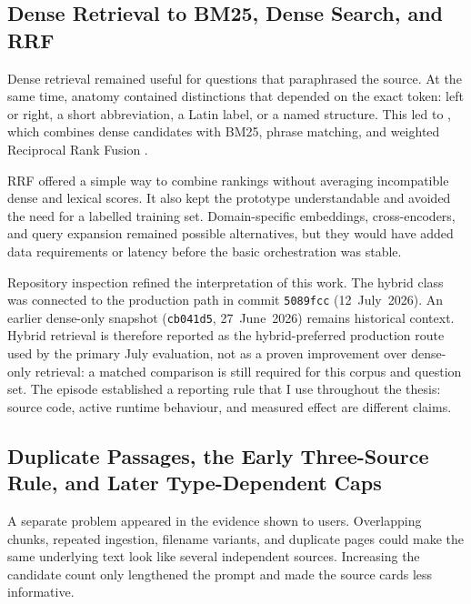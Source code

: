 \subsection{Dense Retrieval to BM25, Dense Search, and RRF}
\label{sec:evolution-hybrid-retrieval}

Dense retrieval remained useful for questions that paraphrased the source. At the same time, anatomy contained distinctions that depended on the exact token: left or right, a short abbreviation, a Latin label, or a named structure. This led to , which combines dense candidates with BM25, phrase matching, and weighted Reciprocal Rank Fusion \parencite{karpukhin2020,robertson2009,cormack2009}.

RRF offered a simple way to combine rankings without averaging incompatible dense and lexical scores. It also kept the prototype understandable and avoided the need for a labelled training set. Domain-specific embeddings, cross-encoders, and query expansion remained possible alternatives, but they would have added data requirements or latency before the basic orchestration was stable.

Repository inspection refined the interpretation of this work. The hybrid class was connected to the production  path in commit \texttt{5089fcc} (12~July~2026). An earlier dense-only snapshot (\texttt{cb041d5}, 27~June~2026) remains historical context. Hybrid retrieval is therefore reported as the hybrid-preferred production route used by the primary July evaluation, not as a proven improvement over dense-only retrieval: a matched comparison is still required for this corpus and question set. The episode established a reporting rule that I use throughout the thesis: source code, active runtime behaviour, and measured effect are different claims.

\subsection{Duplicate Passages, the Early Three-Source Rule, and Later Type-Dependent Caps}
\label{sec:evolution-deduplication}

A separate problem appeared in the evidence shown to users. Overlapping chunks, repeated ingestion, filename variants, and duplicate pages could make the same underlying text look like several independent sources. Increasing the candidate count only lengthened the prompt and made the source cards less informative.


